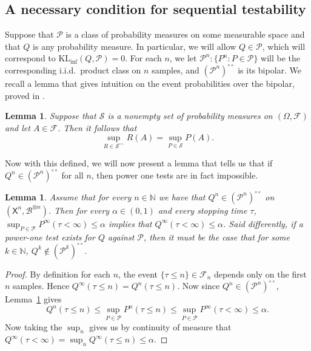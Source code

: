 \documentclass[11pt]{article}
\newcommand{\KLinf}{\mathrm{KL}_{\mathrm{inf}}}
\newcommand{\Pcal}{\mathcal{P}}
\newcommand{\X}{\mathsf{X}}
\newcommand{\B}{\mathcal{B}}
\newtheorem{lemma}[theorem]{Lemma}
\theoremstyle{definition}
\theoremstyle{definition}
\begin{document}
\subsection{A necessary condition for sequential testability}
Suppose that $\Pcal$ is a class of probability measures on some measurable space and that $Q$ is any probability measure. In particular, we will allow $Q\in\Pcal$, which will correspond to $\KLinf(Q,\Pcal)=0$. 
For each $n$, we let $\Pcal^n:\{P^n:P\in\Pcal\}$ will be the corresponding i.i.d.\ product class on $n$ samples, and $(\Pcal^n)^{\circ\circ}$ is its bipolar. We recall a lemma that gives intuition on the event probabilities over the bipolar, proved in \parencite{ram2026powersequentialtestsexist}. 

\begin{lemma}\label{lem:event-sup}
Suppose that $\mathcal{S}$ is a nonempty set of probability measures on $(\Omega, \mathcal{F})$ and let $A\in\mathcal{F}$. Then it follows that
\[
\sup_{R\in\mathcal{S}^{\circ\circ}} R(A)=\sup_{P\in\mathcal S}P(A).
\]
\end{lemma}

Now with this defined, we will now present a lemma that tells us that if $Q^n\in(\Pcal^n)^{\circ\circ}$ for all $n$, then power one tests are in fact impossible.

\begin{lemma}\label{lem:no-power-one-if-in-bipolar}
Assume that for every $n\in\mathbb N$ we have that $Q^n\in(\Pcal^n)^{\circ\circ}$ on $(\X^n,\B^{\otimes n})$. Then for every $\alpha\in(0,1)$ and every stopping time $\tau$, $\sup_{P\in\Pcal}P^\infty(\tau<\infty)\le\alpha$ implies that $Q^\infty(\tau<\infty)\le \alpha$. 
Said differently, if a power-one test exists for $Q$ against $\Pcal$, then it must be the case that for some $k \in \mathbb N$, $Q^k\notin(\Pcal^k)^{\circ\circ}$.
\end{lemma}

\begin{proof}
By definition for each $n$, the event $\{\tau\le n\}\in\mathcal F_n$ depends only on the first $n$ samples. Hence $Q^\infty(\tau\le n)=Q^n(\tau\le n)$. Now since $Q^n\in(\Pcal^n)^{\circ\circ}$, Lemma~\ref{lem:event-sup} gives
\[
Q^n(\tau\le n)\le \sup_{P\in\Pcal}P^n(\tau\le n)\le \sup_{P\in\Pcal}P^\infty(\tau<\infty)\le \alpha.
\]
Now taking the $\sup_n$ gives us by continuity of measure that $Q^\infty(\tau<\infty)=\sup_n Q^\infty(\tau\le n)\le \alpha$.
\end{proof}
\end{document}

